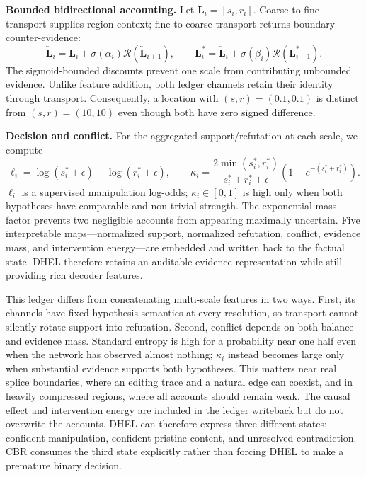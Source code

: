 \textbf{Bounded bidirectional accounting.}
Let $\mathbf L_i=[s_i,r_i]$. Coarse-to-fine transport supplies region context;
fine-to-coarse transport returns boundary counter-evidence:
\begin{equation}
\overleftarrow{\mathbf L}_i=\mathbf L_i+\sigma(\alpha_i)
\mathcal R(\overleftarrow{\mathbf L}_{i+1}),\qquad
\mathbf L_i^*=\overleftarrow{\mathbf L}_i+\sigma(\beta_i)
\mathcal R(\mathbf L_{i-1}^*).
\label{eq:new_ledger_transport}
\end{equation}
The sigmoid-bounded discounts prevent one scale from contributing unbounded
evidence. Unlike feature addition, both ledger channels retain their identity
through transport. Consequently, a location with $(s,r)=(0.1,0.1)$ is distinct
from $(s,r)=(10,10)$ even though both have zero signed difference.

\textbf{Decision and conflict.}
For the aggregated support/refutation at each scale, we compute
\begin{equation}
\ell_i=\log(s_i^*+\epsilon)-\log(r_i^*+\epsilon),\qquad
\kappa_i=\frac{2\min(s_i^*,r_i^*)}{s_i^*+r_i^*+\epsilon}
\left(1-e^{-(s_i^*+r_i^*)}\right).
\label{eq:new_conflict}
\end{equation}
$\ell_i$ is a supervised manipulation log-odds; $\kappa_i\in[0,1]$ is high only
when both hypotheses have comparable and non-trivial strength. The exponential
mass factor prevents two negligible accounts from appearing maximally uncertain.
Five interpretable maps---normalized support, normalized refutation, conflict,
evidence mass, and intervention energy---are embedded and written back to the factual state. DHEL therefore retains an
auditable evidence representation while still providing rich decoder features.

This ledger differs from concatenating multi-scale features in two ways. First,
its channels have fixed hypothesis semantics at every resolution, so transport
cannot silently rotate support into refutation. Second, conflict depends on both
balance and evidence mass. Standard entropy is high for a probability near one
half even when the network has observed almost nothing; $\kappa_i$ instead becomes
large only when substantial evidence supports both hypotheses. This matters near
real splice boundaries, where an editing trace and a natural edge can coexist,
and in heavily compressed regions, where all accounts should remain weak. The
causal effect and intervention energy are included in the ledger writeback but do
not overwrite the accounts. DHEL can therefore express three different states:
confident manipulation, confident pristine content, and unresolved contradiction.
CBR consumes the third state explicitly rather than forcing DHEL to make a
premature binary decision.

